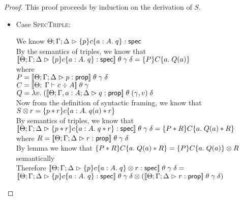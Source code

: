 \begin{proof}
  This proof proceeds by induction on the derivation of $S$. 

  \begin{itemize}
  \item Case \textsc{SpecTriple}: 
    \begin{tabbedproof}
      \oo We know $\judgeS{\spec{p}{c}{a:A}{q}}$ \\
      \oo By the semantics of triples, we know that \\
      \ooo 
          $\interp{\judgeS{\spec{p}{c}{a:A}{q}}}\;\theta\;\gamma\;\delta = \spec{P}{C}{a}{Q(a)}$ \\ 
      \ox where \\
      \oox $P = \interp{\judgeA{p}{\assert}}\;\theta\;\gamma\;\delta$ \\
      \oox $C = \interp{\judgeC[\Theta]{\Gamma}{c}{A}}\;\theta\;\gamma$ \\
      \oox $Q = \semfun{v}{(\interp{\judgeA[\Theta; \Gamma, a:A; \Delta]{q}{\assert}}\;\theta\;(\gamma, v)\;\delta}$ \\
      \oo Now from the definition of syntactic framing, we know that $\Frame{S}{r} = \spec{p * r}{c}{a:A}{q(a) * r}$ \\
      \oo By semantics of triples, we know that \\
      \oox $\interp{\judgeS{\spec{p * r}{c}{a:A}{q * r}}}\;\theta\;\gamma\;\delta = \spec{P * R}{C}{a}{Q(a) * R}$ \\ 
      \ox where $R = \interp{\judgeA{r}{\assert}}\;\theta\;\gamma\;\delta$ \\
      \oo By lemma we know that $\spec{P * R}{C}{a}{Q(a) * R} = \Frame{\spec{P}{C}{a}{Q(a)}}{R}$ 
          semantically \\
      \oo Therefore $\interp{\judgeS{\Frame{\spec{p}{c}{a:A}{q}}{r}}}\;\theta\;\gamma\;\delta = $ \\
      \oox $\Frame{\interp{\judgeS{\spec{p}{c}{a:A}{q}}}\;\theta\;\gamma\;\delta}{(\interp{\judgeA{r}{\assert}}\;\theta\;\gamma\;\delta)}$
    \end{tabbedproof}


\end{itemize}
\end{proof}
